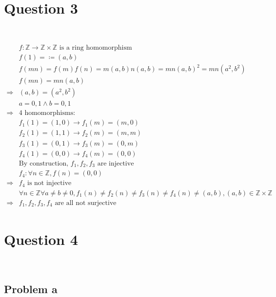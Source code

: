 \documentclass{article}
\begin{document}
\newpage

\section*{Question 3}

~

\begin{equation*}
    \begin{split}
        &f:\mathbb{Z} \rightarrow\mathbb{Z} \times\mathbb{Z} \text{ is a ring homomorphism}\\
        &f(1)=\coloneqq(a,b)\\
        &f(mn)=f(m)f(n)=m(a,b)n(a,b)=mn(a,b)^2=mn(a^2,b^2)\\
        &f(mn)=mn(a,b)\\
        \Rightarrow&(a,b)=(a^2,b^2)\\
        &a=0,1\land b=0,1\\
        \Rightarrow&4\text{ homomorphisms}:\\
        &f_1(1)=(1,0)\rightarrow f_1(m)=(m,0)\\
        &f_2(1)=(1,1)\rightarrow f_2(m)=(m,m)\\
        &f_3(1)=(0,1)\rightarrow f_3(m)=(0,m)\\
        &f_4(1)=(0,0)\rightarrow f_4(m)=(0,0)\\
        &\text{By construction, }f_1,f_2,f_3\text{ are injective}\\
        &f_4:\forall n\in \mathbb{Z} ,f(n)=(0,0)\\
        \Rightarrow&f_4\text{ is not injective}\\
        &\forall n\in\mathbb{Z} \forall a\ne b\ne 0,f_1(n)\ne f_2(n)\ne f_3(n)\ne f_4(n)\ne(a,b),(a,b)\in\mathbb{Z} \times\mathbb{Z}\\
        \Rightarrow&f_1,f_2,f_3,f_4\text{ are all not surjective}\\
    \end{split}
\end{equation*}

\newpage

\section*{Question 4}

~

\subsection*{Problem a}
\end{document}

